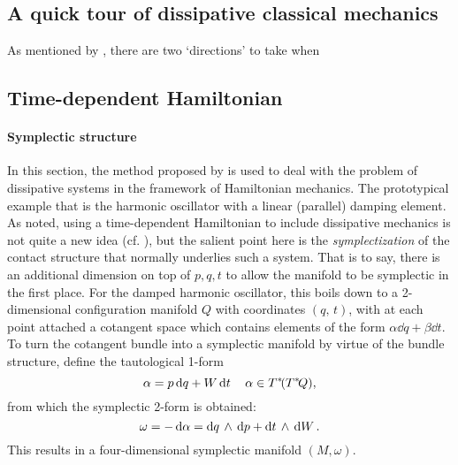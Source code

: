 \subsection{A quick tour of dissipative classical mechanics}
As mentioned by \citet{Dekker1981}, there are two `directions' to take when 

\subsection{Time-dependent Hamiltonian}
\paragraph{Symplectic structure} In this section, the method proposed by \citet{Mendel2021} is used to deal with the problem of dissipative systems in the framework of Hamiltonian mechanics. The prototypical example that is the harmonic oscillator with a linear (parallel) damping element. As noted, using a time-dependent Hamiltonian to include dissipative mechanics is not quite a new idea (cf. \citet{Dekker1981}), but the salient point here is the \emph{symplectization} of the contact structure that normally underlies such a system. That is to say, there is an additional dimension on top of $p, q, t$ to allow the manifold to be symplectic in the first place. For the damped harmonic oscillator, this boils down to a 2-dimensional configuration manifold $Q$ with coordinates $(q,\,t)$, with at each point attached a cotangent space which contains elements of the form $\alpha\dd{q} + \beta\dd{t}$. To turn the cotangent bundle into a symplectic manifold by virtue of the bundle structure, define the tautological 1-form
$$ \alpha = p\dd{q} + W\dd{t} \quad \alpha \in T^*\!(T^*\!Q),$$
from which the symplectic 2-form is obtained:
$$ \omega = -\dd{\alpha} =  \dd{q}\,\wedge\,\dd{p}  +  \dd{t}\,\wedge\,\dd{W} .$$
This results in a four-dimensional symplectic manifold $(M, \omega)$. 

